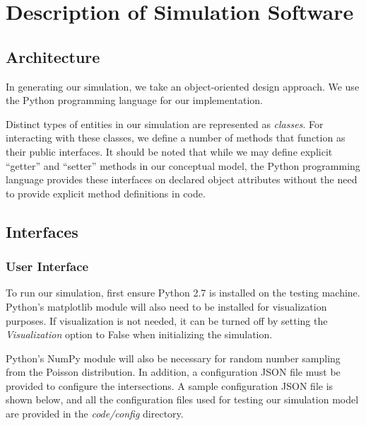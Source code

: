 \documentclass[12pt]{article}
\begin{document}
\section{Description of Simulation Software}

\subsection{Architecture}
In generating our simulation, we take an object-oriented design approach. We use
the Python programming language for our implementation.

Distinct types of entities in our simulation are represented as
\textit{classes}. For interacting with these classes, we define a number of
methods that function as their public interfaces. It should be noted that while
we may define explicit ``getter'' and ``setter'' methods in our conceptual model,
the Python programming language provides these interfaces on declared object
attributes without the need to provide explicit method definitions in code.

\subsection{Interfaces}

\subsubsection{User Interface}

To run our simulation, first ensure Python 2.7 is installed on the testing
machine. Python's matplotlib module will also need to be installed for
visualization purposes. If visualization is not needed, it can be turned
off by setting the \textit{Visualization} option to False when initializing the
simulation.

Python's NumPy module will also be necessary for random number sampling from
the Poisson distribution. In addition, a configuration JSON file must be
provided to configure the intersections. A sample configuration JSON file is
shown below, and all the configuration files used for testing our simulation
model are provided in the \textit{code/config} directory.
\end{document}

